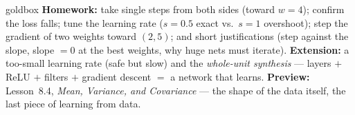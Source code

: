 \documentclass[10pt]{article}
\begin{document}
\begin{skillbox}{goldbox}
\textbf{Homework:} take single steps from both sides (toward $w=4$); confirm the loss falls; tune the learning
rate ($s=0.5$ exact vs.\ $s=1$ overshoot); step the gradient of two weights toward $(2,5)$; and short
justifications (step against the slope, slope $=0$ at the best weights, why huge nets must iterate).
\textbf{Extension:} a too-small learning rate (safe but slow) and the \emph{whole-unit synthesis} --- layers
$+$ ReLU $+$ filters $+$ gradient descent $=$ a network that learns. \textbf{Preview:} Lesson~8.4, \emph{Mean,
Variance, and Covariance} --- the shape of the data itself, the last piece of learning from data.
\end{skillbox}
\end{document}
